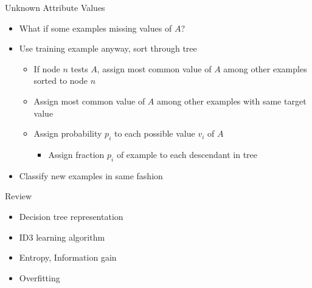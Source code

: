 \documentclass[%
pdf,
colorBG,
slideColor,
tcrico,
]{prosper}
\begin{document}
\begin{slide}{Unknown Attribute Values } 
\begin{itemize}
\item What if some examples missing values of $A$?
 \item Use training example anyway, sort through tree
	\begin{itemize}
	\item If node $n$ tests $A$, assign most common value of $A$ among other examples
sorted to node $n$
	\item Assign most common value of $A$ among other examples with same target value
	\item Assign probability $p_{i}$ to each possible value $v_{i}$ of $A$
		\begin{itemize}
		\item Assign fraction $p_{i}$ of example to each descendant in tree
		\end{itemize}
	\end{itemize}
\item Classify new examples in same fashion
\end{itemize}
\end{slide}


\begin{slide}{Review}
\begin{itemize}
\item Decision tree representation
\item ID3 learning algorithm
\item Entropy, Information gain
\item Overfitting
\end{itemize}

\end{slide}
\end{document}

